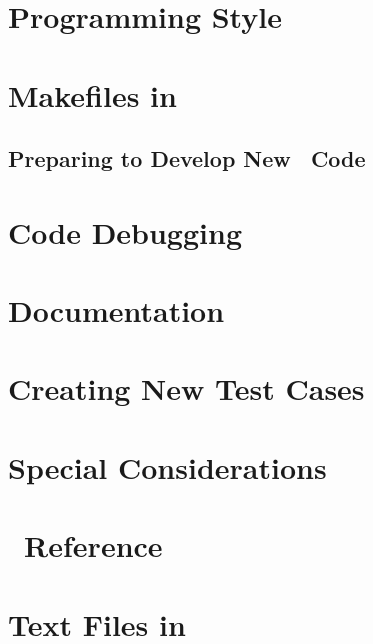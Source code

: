\documentclass[12pt]{article}
\begin{document}
\section{Programming Style}\label{Style}


\section{Makefiles in \PSIthree}\label{Makefiles}


\subsection{Preparing to Develop New \PSIthree\ Code}\label{New_Code}


\section{Code Debugging}\label{Debugging}


\section{Documentation}\label{Documentation}


\section{Creating New Test Cases}\label{Testing}


\section{Special Considerations}\label{Special_Considerations}


\newpage
\appendix

%

\section{\PSIthree\ Reference}\label{PSI_Reference}


\section{Text Files in \PSIthree}\label{Text_files}

\end{document}
